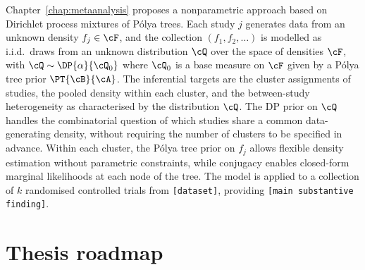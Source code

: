 Chapter~\ref{chap:metaanalysis} proposes a nonparametric approach based on
Dirichlet process mixtures of P\'{o}lya trees.  Each study $j$ generates
data from an unknown density $f_j \in \cF$, and the collection
$(f_1, f_2, \ldots)$ is modelled as i.i.d.\ draws from an unknown
distribution $\cQ$ over the space of densities $\cF$, with $\cQ \sim
\DP{\alpha}{\cQ_0}$ where $\cQ_0$ is a base measure on $\cF$ given by a
P\'{o}lya tree prior $\PT{\cB}{\cA}$.  The inferential targets are the
cluster assignments of studies, the pooled density within each cluster, and
the between-study heterogeneity as characterised by the distribution $\cQ$.
The DP prior on $\cQ$ handles the combinatorial question of which studies
share a common data-generating density, without requiring the number of
clusters to be specified in advance.  Within each cluster, the P\'{o}lya
tree prior on $f_j$ allows flexible density estimation without parametric
constraints, while conjugacy enables closed-form marginal likelihoods at
each node of the tree.  The model is applied to a collection of $k$
randomised controlled trials from \texttt{[dataset]}, providing
\texttt{[main substantive finding]}.

\section{Thesis roadmap}
\label{sec:intro:roadmap}

